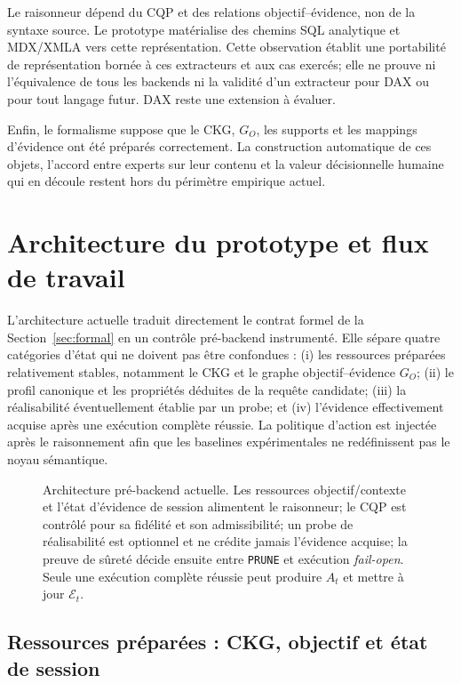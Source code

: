 \documentclass[journal]{IEEEtran}
\begin{document}
Le raisonneur dépend du CQP et des relations objectif--évidence, non de la syntaxe source. Le prototype matérialise des chemins SQL analytique et MDX/XMLA vers cette représentation. Cette observation établit une portabilité de représentation bornée à ces extracteurs et aux cas exercés; elle ne prouve ni l'équivalence de tous les backends ni la validité d'un extracteur pour DAX ou pour tout langage futur. DAX reste une extension à évaluer.

Enfin, le formalisme suppose que le CKG, $G_O$, les supports et les mappings d'évidence ont été préparés correctement. La construction automatique de ces objets, l'accord entre experts sur leur contenu et la valeur décisionnelle humaine qui en découle restent hors du périmètre empirique actuel.


\section{Architecture du prototype et flux de travail}
\label{sec:arch}

L'architecture actuelle traduit directement le contrat formel de la Section~\ref{sec:formal} en un contrôle pré-backend instrumenté. Elle sépare quatre catégories d'état qui ne doivent pas être confondues : (i) les ressources préparées relativement stables, notamment le CKG et le graphe objectif--évidence $G_O$; (ii) le profil canonique et les propriétés déduites de la requête candidate; (iii) la réalisabilité éventuellement établie par un probe; et (iv) l'évidence effectivement acquise après une exécution complète réussie. La politique d'action est injectée après le raisonnement afin que les baselines expérimentales ne redéfinissent pas le noyau sémantique.

\begin{figure}[!t]
\centering
\resizebox{\textwidth}{!}{}
\caption{Architecture pré-backend actuelle. Les ressources objectif/contexte et l'état d'évidence de session alimentent le raisonneur; le CQP est contrôlé pour sa fidélité et son admissibilité; un probe de réalisabilité est optionnel et ne crédite jamais l'évidence acquise; la preuve de sûreté décide ensuite entre \texttt{PRUNE} et exécution \emph{fail-open}. Seule une exécution complète réussie peut produire $A_t$ et mettre à jour $\mathcal{E}_t$.}
\label{fig:arch-mcad}
\end{figure}

\subsection{Ressources préparées : CKG, objectif et état de session}
\end{document}
